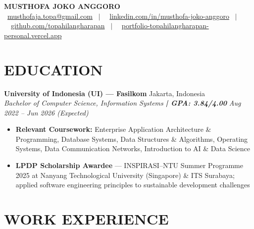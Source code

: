 \documentclass[10pt,a4paper]{article}
\newcommand{\contactline}[1]{\small #1}
\newcommand{\experienceheader}[4]{
    \textbf{#1} \hfill #2 \\
    \textit{#3} \hfill \textit{#4}
}
\begin{document}
\begin{center}
    {\LARGE \textbf{MUSTHOFA JOKO ANGGORO}} \\[2pt]
    \contactline{
        \faEnvelope\ \href{mailto:musthofaja.topa@gmail.com}{musthofaja.topa@gmail.com} \ $|$ \ 
        \faLinkedin\ \href{https://www.linkedin.com/in/musthofa-joko-anggoro/}{linkedin.com/in/musthofa-joko-anggoro} \ $|$ \
        \faGithub\ \href{https://github.com/topahilangharapan}{github.com/topahilangharapan} \ $|$ \
        \faGlobe\ \href{https://portfolio-topahilangharapan-personal.vercel.app/}{portfolio-topahilangharapan-personal.vercel.app}
    }
\end{center}

\vspace{-8pt}

\section*{EDUCATION}

\experienceheader{University of Indonesia (UI) --- Fasilkom}{Jakarta, Indonesia}{Bachelor of Computer Science, Information Systems \textbf{| GPA: 3.84/4.00}}{Aug 2022 -- Jun 2026 (Expected)}
\begin{itemize}[leftmargin=*, itemsep=0.5pt, topsep=1pt]
    \item \textbf{Relevant Coursework:} Enterprise Application Architecture \& Programming, Database Systems, Data Structures \& Algorithms, Operating Systems, Data Communication Networks, Introduction to AI \& Data Science
    \item \textbf{LPDP Scholarship Awardee} --- INSPIRASI--NTU Summer Programme 2025 at Nanyang Technological University (Singapore) \& ITS Surabaya; applied software engineering principles to sustainable development challenges
\end{itemize}

\vspace{-4pt}

\section*{WORK EXPERIENCE}
\end{document}
